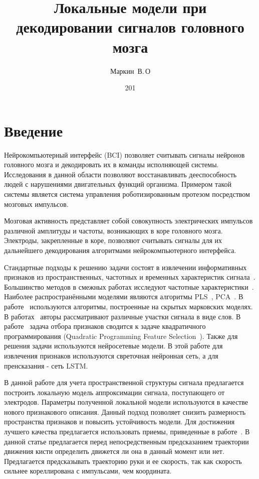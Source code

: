 \documentclass[12pt,twoside]{article}
\title{
Локальные модели при декодировании сигналов головного мозга}
\author{Маркин~В.\,О}
\date{201}
\begin{document}
\bigskip
\bigskip\bigskip
\maketitle
\bigskip
\section{Введение}
Нейрокомпьютерный интерфейс (BCI) позволяет считывать сигналы нейронов головного мозга и декодировать их в команды исполняющей системы. Исследования в данной области позволяют восстанавливать дееспособность людей с нарушениями двигательных функций организма. Примером такой системы является система управления роботизированным протезом посредством мозговых импульсов. 

Мозговая активность представляет собой совокупность электрических импульсов различной амплитуды и частоты, возникающих в коре головного мозга. Электроды, закрепленные в коре, позволяют считывать сигналы для их дальнейшего декодирования алгоритмами нейрокомпьютерного интерфейса.

Стандартные подходы к решению задачи состоят в извлечении информативных признаков из пространственных, частотных и временных характеристик сигнала~\cite{Morishita2014,Alexander2013}. Большинство методов в смежных работах исследуют частотные характеристики~\cite{Chin2007,Eliseyev2014,Loza2017}. Наиболее распространёнными моделями являются алгоритмы PLS~\cite{Rosipal2006,Eliseyev2016,Eliseyev2014}, PCA~\cite{Zhao2010,Song2017}. В работе~\cite{Zhao2014} используются алгоритмы, построенные на скрытых марковских моделях. В  работах~\cite{Loza2017,Song2017} авторы рассматривают различные участки сигнала в виде слов. В работе~\cite{Strijov2018} задача отбора признаков сводится к задаче квадратичного программирования (Quadratic Programming Feature Selection~\cite{rodriguez2010quadratic}).
Также для решения задачи используются нейросетевые модели\cite{Xie2018DeepLA}. В этой работе для извлечения признаков используются свреточная нейронная сеть, а для пренсказания - сеть LSTM.

В данной работе для учета пространственной структуры сигнала предлагается построить локальную модель аппроксимации сигнала, поступающего от электродов. Параметры полученной локальной модели используются в качестве нового признакового описания. Данный подход позволяет снизить размерность пространства признаков и повысить устойчивость модели. Для достижения лучшего качества предлагается использовать приемы, приведенные в работе~\cite{Bundy2016}. В данной статье предлагается перед непосредственным предсказанием траектории движения кисти определить движется ли она в данный момент или нет. Предлагается предсказывать траекторию руки и ее скорость, так как скорость сильнее кореллирована с импульсами, чем координата.
\end{document}
